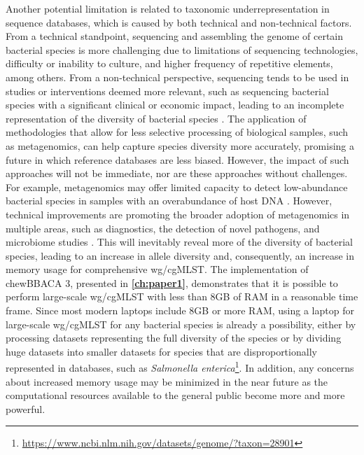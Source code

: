 Another potential limitation is related to taxonomic underrepresentation in sequence databases, which is caused by both technical and non-technical factors. From a technical standpoint, sequencing and assembling the genome of certain bacterial species is more challenging due to limitations of sequencing technologies, difficulty or inability to culture, and higher frequency of repetitive elements, among others. From a non-technical perspective, sequencing tends to be used in studies or interventions deemed more relevant, such as sequencing bacterial species with a significant clinical or economic impact, leading to an incomplete representation of the diversity of bacterial species \cite{chorlton_ten_2024}. The application of methodologies that allow for less selective processing of biological samples, such as metagenomics, can help capture species diversity more accurately, promising a future in which reference databases are less biased. However, the impact of such approaches will not be immediate, nor are these approaches without challenges. For example, metagenomics may offer limited capacity to detect low-abundance bacterial species in samples with an overabundance of host \ac{DNA} \cite{mcardle_sensitivity_2020, gao_benchmarking_2025, govender_benchmarking_2022, constantinides_hostile_2023, billington_metagenomics_2022}. However, technical improvements are promoting the broader adoption of metagenomics in multiple areas, such as diagnostics, the detection of novel pathogens, and microbiome studies \cite{buddle_evaluating_2024}. This will inevitably reveal more of the diversity of bacterial species, leading to an increase in allele diversity and, consequently, an increase in memory usage for comprehensive \ac{wg/cgMLST}. The implementation of chewBBACA 3, presented in \textbf{\autoref{ch:paper1}}, demonstrates that it is possible to perform large-scale \ac{wg/cgMLST} with less than 8GB of \ac{RAM} in a reasonable time frame. Since most modern laptops include 8GB or more \ac{RAM}, using a laptop for large-scale \ac{wg/cgMLST} for any bacterial species is already a possibility, either by processing datasets representing the full diversity of the species or by dividing huge datasets into smaller datasets for species that are disproportionally represented in databases, such as \textit{Salmonella enterica}\footnote{\url{https://www.ncbi.nlm.nih.gov/datasets/genome/?taxon=28901}}. In addition, any concerns about increased memory usage may be minimized in the near future as the computational resources available to the general public become more and more powerful.

